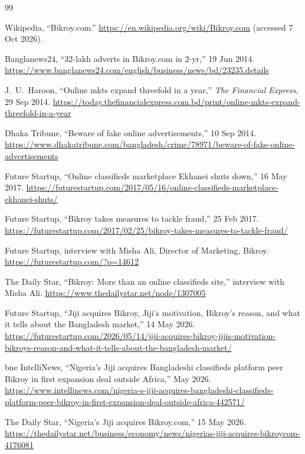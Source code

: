 \documentclass[11pt,a4paper]{article}
\begin{document}
\begin{thebibliography}{99}
\small

 Wikipedia, ``Bikroy.com.''
\url{https://en.wikipedia.org/wiki/Bikroy.com} (accessed 7 Oct 2026).

 Banglanews24, ``32-lakh adverts in Bikroy.com in 2-yr,'' 19 Jun 2014.
\url{https://www.banglanews24.com/english/business/news/bd/23235.details}

 J.~U.~Haroon, ``Online mkts expand threefold in a year,''
\emph{The Financial Express}, 29 Sep 2014.
\url{https://today.thefinancialexpress.com.bd/print/online-mkts-expand-threefold-in-a-year}

 Dhaka Tribune, ``Beware of fake online advertisements,'' 10 Sep 2014.
\url{https://www.dhakatribune.com/bangladesh/crime/78971/beware-of-fake-online-advertisements}

 Future Startup, ``Online classifieds marketplace Ekhanei shuts down,''
16 May 2017.
\url{https://futurestartup.com/2017/05/16/online-classifieds-marketplace-ekhanei-shuts/}

 Future Startup, ``Bikroy takes measures to tackle fraud,'' 25 Feb 2017.
\url{https://futurestartup.com/2017/02/25/bikroy-takes-measures-to-tackle-fraud/}

 Future Startup, interview with Misha Ali, Director of Marketing, Bikroy.
\url{https://futurestartup.com/?p=14612}

 The Daily Star, ``Bikroy: More than an online classifieds site,''
interview with Misha Ali. \url{https://www.thedailystar.net/node/1307005}

 Future Startup, ``Jiji acquires Bikroy, Jiji's motivation, Bikroy's
reason, and what it tells about the Bangladesh market,'' 14 May 2026.
\url{https://futurestartup.com/2026/05/14/jiji-acquires-bikroy-jijis-motivation-bikroys-reason-and-what-it-tells-about-the-bangladesh-market/}

 bne IntelliNews, ``Nigeria's Jiji acquires Bangladeshi classifieds
platform peer Bikroy in first expansion deal outside Africa,'' May 2026.
\url{https://www.intellinews.com/nigeria-s-jiji-acquires-bangladeshi-classifieds-platform-peer-bikroy-in-first-expansion-deal-outside-africa-442571/}

 The Daily Star, ``Nigeria's Jiji acquires Bikroy.com,'' 15 May 2026.
\url{https://thedailystar.net/business/economy/news/nigerias-jiji-acquires-bikroycom-4176081}


\end{thebibliography}
\end{document}
